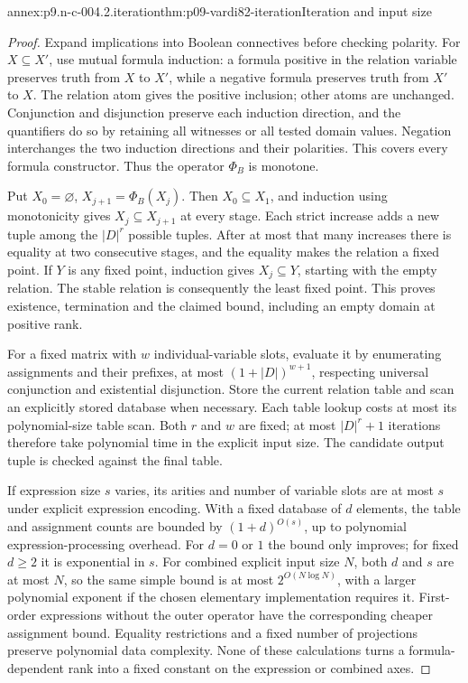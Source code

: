 \begin{annexitem}{annex:p9.n-c-004.2.iteration}{thm:p09-vardi82-iteration}{Iteration and input size}
\begin{proof}
Expand implications into Boolean connectives before checking polarity.
For \(X\subseteq X'\), use mutual formula induction: a formula positive
in the relation variable preserves truth from \(X\) to \(X'\), while a
negative formula preserves truth from \(X'\) to \(X\).
The relation atom gives the positive inclusion; other atoms are unchanged.
Conjunction and disjunction preserve each induction direction, and the
quantifiers do so by retaining all witnesses or all tested domain values.
Negation interchanges the two induction directions and their polarities.
This covers every formula constructor.  Thus the operator
\(\Phi_B\) is monotone.

Put \(X_0=\varnothing\), \(X_{j+1}=\Phi_B(X_j)\).
Then \(X_0\subseteq X_1\), and induction using monotonicity gives
\(X_j\subseteq X_{j+1}\) at every stage.  Each strict increase adds a new
tuple among the \(\lvert D\rvert^r\) possible tuples.  After at most that
many increases there is equality at two consecutive stages, and the equality
makes the relation a fixed point.  If \(Y\) is any fixed point, induction
gives \(X_j\subseteq Y\), starting with the empty relation.  The stable
relation is consequently the least fixed point.  This proves existence,
termination and the claimed bound, including an empty domain at positive rank.

For a fixed matrix with \(w\) individual-variable slots, evaluate it by
enumerating assignments and their prefixes, at most
\((1+\lvert D\rvert)^{w+1}\), respecting
universal conjunction and existential disjunction.  Store the current
relation table and scan an explicitly stored database when necessary.
Each table lookup costs at most its polynomial-size table scan.
Both \(r\) and \(w\) are fixed; at most \(\lvert D\rvert^r+1\)
iterations therefore take polynomial time in the explicit input size.
The candidate output tuple is checked against the final table.

If expression size \(s\) varies, its arities and number of variable slots
are at most \(s\) under explicit expression encoding.  With a fixed
database of \(d\) elements, the table and assignment counts are bounded by
\((1+d)^{O(s)}\), up to polynomial expression-processing overhead.
For \(d=0\) or \(1\) the bound only improves; for fixed \(d\geq2\)
it is exponential in \(s\).  For combined explicit input size \(N\),
both \(d\) and \(s\) are at most \(N\), so the same simple bound is
at most \(2^{O(N\log N)}\), with a larger polynomial exponent if the
chosen elementary implementation requires it.  First-order expressions
without the outer operator have the corresponding cheaper assignment bound.
Equality restrictions and a fixed number of projections preserve polynomial
data complexity.  None of these calculations turns a formula-dependent rank
into a fixed constant on the expression or combined axes.
\end{proof}
\end{annexitem}

